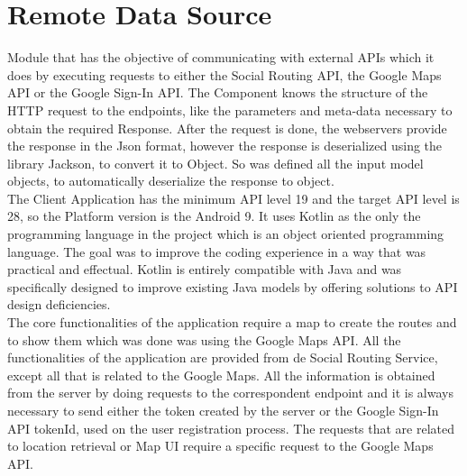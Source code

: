 \section*{Remote Data Source}
Module that has the objective of communicating with external APIs which it does by executing requests to either the Social Routing API, the Google Maps API or the Google Sign-In API. 
The Component knows the structure of the HTTP request to the endpoints, like the parameters and meta-data necessary to obtain the required Response.
After the request is done, the webservers provide the response in the Json\cite{jsonwebsite} format, however the response is deserialized using the library Jackson\cite{jackson},
to convert it to Object. So was defined all the input model objects, to automatically deserialize the response to object.\\

The Client Application has the minimum API level 19 and the target API level is 28, so the Platform version is the Android 9.
It uses Kotlin as the only the programming language in the project which is an object oriented programming language. 
The goal was to improve the coding experience in a way that was practical and effectual. Kotlin is entirely compatible with Java and was specifically designed
to improve existing Java models by offering solutions to API design deficiencies. \\
The core functionalities of the application require a map to create the routes and to show them which was done was using the Google Maps API.
All the functionalities of the application are provided from de Social Routing Service, except all that is related to the Google Maps. All the information is obtained from the server by doing
requests to the correspondent endpoint and it is always necessary to send either the token created by the server or the Google Sign-In API tokenId, used on the user registration process.
The requests that are related to location retrieval or Map UI require a specific request to the Google Maps API. \\
\newpage
